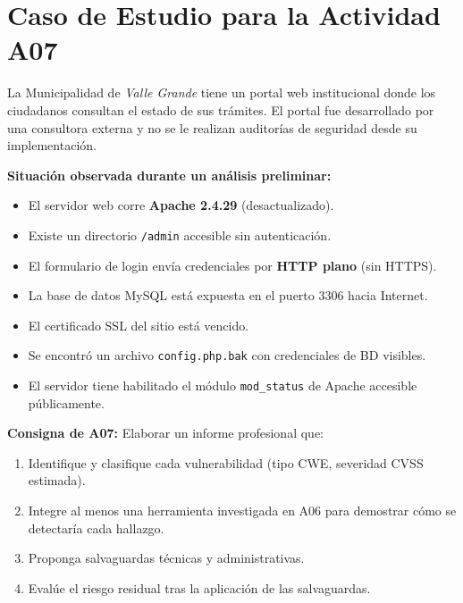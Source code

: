 \documentclass[11pt,a4paper]{article}
\begin{document}
\section{Caso de Estudio para la Actividad A07}

\begin{reflexion}
La Municipalidad de \textit{Valle Grande} tiene un portal web institucional donde los ciudadanos consultan el estado de sus trámites. El portal fue desarrollado por una consultora externa y no se le realizan auditorías de seguridad desde su implementación.

\textbf{Situación observada durante un análisis preliminar:}
\begin{itemize}[leftmargin=*]
  \item El servidor web corre \textbf{Apache 2.4.29} (desactualizado).
  \item Existe un directorio \texttt{/admin} accesible sin autenticación.
  \item El formulario de login envía credenciales por \textbf{HTTP plano} (sin HTTPS).
  \item La base de datos MySQL está expuesta en el puerto 3306 hacia Internet.
  \item El certificado SSL del sitio está vencido.
  \item Se encontró un archivo \texttt{config.php.bak} con credenciales de BD visibles.
  \item El servidor tiene habilitado el módulo \texttt{mod\_status} de Apache accesible públicamente.
\end{itemize}

\textbf{Consigna de A07:} Elaborar un informe profesional que:
\begin{enumerate}
  \item Identifique y clasifique cada vulnerabilidad (tipo CWE, severidad CVSS estimada).
  \item Integre al menos una herramienta investigada en A06 para demostrar cómo se detectaría cada hallazgo.
  \item Proponga salvaguardas técnicas y administrativas.
  \item Evalúe el riesgo residual tras la aplicación de las salvaguardas.
\end{enumerate}
\end{reflexion}

\end{document}
